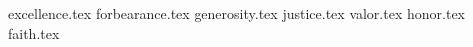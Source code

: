 

\raggedcolumns\begin{multicols}{2}

	\startsortedpricelistNSP
	
	{excellence.tex}
	{forbearance.tex}
	{generosity.tex}
	{justice.tex}
	{valor.tex}
	{honor.tex}
	{faith.tex}

	\endsortedpricelistNSP

\end{multicols}
